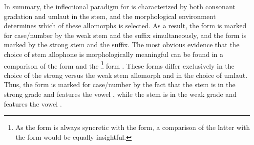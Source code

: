 
In summary, the inflectional paradigm for  is characterized by both consonant gradation and umlaut in the stem, %
and the morphological environment determines which of these allomorphs is selected. %
As a result, the  form  is marked for case/number by the weak  stem and the \mbox{} suffix simultaneously, and the  form  is marked by the strong  stem and the  suffix. The most obvious evidence that the choice of stem allophone is morphologically meaningful can be found in a comparison of the  form  and the \footnote{As the  form is always syncretic with the  form, a comparison of the latter with the  form would be equally insightful.} 
form . These forms differ exclusively in the choice of the strong versus the weak stem allomorph and in the choice of umlaut. Thus, the  form  is marked for case/number by the fact that the stem is in the strong grade and features the vowel , while the  stem is in the weak grade and features the vowel . 

